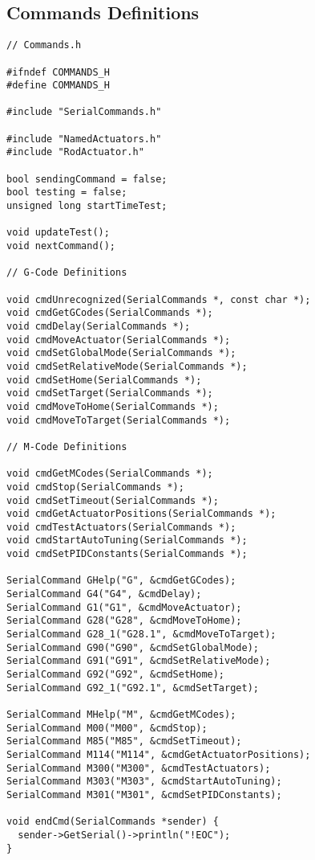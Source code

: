 \subsection{Commands Definitions}
\begin{verbatim}
// Commands.h

#ifndef COMMANDS_H
#define COMMANDS_H

#include "SerialCommands.h"

#include "NamedActuators.h"
#include "RodActuator.h"

bool sendingCommand = false;
bool testing = false;
unsigned long startTimeTest;

void updateTest();
void nextCommand();

// G-Code Definitions

void cmdUnrecognized(SerialCommands *, const char *);
void cmdGetGCodes(SerialCommands *);
void cmdDelay(SerialCommands *);
void cmdMoveActuator(SerialCommands *);
void cmdSetGlobalMode(SerialCommands *);
void cmdSetRelativeMode(SerialCommands *);
void cmdSetHome(SerialCommands *);
void cmdSetTarget(SerialCommands *);
void cmdMoveToHome(SerialCommands *);
void cmdMoveToTarget(SerialCommands *);

// M-Code Definitions

void cmdGetMCodes(SerialCommands *);
void cmdStop(SerialCommands *);
void cmdSetTimeout(SerialCommands *);
void cmdGetActuatorPositions(SerialCommands *);
void cmdTestActuators(SerialCommands *);
void cmdStartAutoTuning(SerialCommands *);
void cmdSetPIDConstants(SerialCommands *);

SerialCommand GHelp("G", &cmdGetGCodes);
SerialCommand G4("G4", &cmdDelay);
SerialCommand G1("G1", &cmdMoveActuator);
SerialCommand G28("G28", &cmdMoveToHome);
SerialCommand G28_1("G28.1", &cmdMoveToTarget);
SerialCommand G90("G90", &cmdSetGlobalMode);
SerialCommand G91("G91", &cmdSetRelativeMode);
SerialCommand G92("G92", &cmdSetHome);
SerialCommand G92_1("G92.1", &cmdSetTarget);

SerialCommand MHelp("M", &cmdGetMCodes);
SerialCommand M00("M00", &cmdStop);
SerialCommand M85("M85", &cmdSetTimeout);
SerialCommand M114("M114", &cmdGetActuatorPositions);
SerialCommand M300("M300", &cmdTestActuators);
SerialCommand M303("M303", &cmdStartAutoTuning);
SerialCommand M301("M301", &cmdSetPIDConstants);

void endCmd(SerialCommands *sender) {
  sender->GetSerial()->println("!EOC");
}


\end{verbatim}
